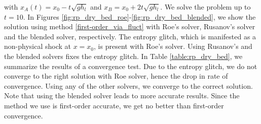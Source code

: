 \documentclass[preprint, 11pt]{article}
\begin{document}
with $x_A(t)=x_0 - t\sqrt{gh_l}$ and $x_B=x_0+2t\sqrt{gh_l}$.
We solve the problem up to $t=10$.
In Figures \ref{fig:rp_dry_bed_roe}-\ref{fig:rp_dry_bed_blended},
we show the solution using method \eqref{first-order_via_fluct}
with Roe's solver, Rusanov's solver and the blended solver, respectively.
The entropy glitch, which is manifested as a non-physical shock at $x=x_0$,
is present with Roe's solver. Using Rusanov's and the blended solvers
fixes the entropy glitch.
In Table \ref{table:rp_dry_bed}, we summarize the results of a convergence test.
{\color{OliveGreen}
    Due to the entropy glitch, we do not converge to the right solution with Roe solver,
    hence the drop in rate of convergence. Using any of the other solvers, we converge to the 
    correct solution. Note that using the blended solver leads to more accurate results. 
    Since the method we use is first-order accurate, we get no better than first-order convergence.}
\end{document}
